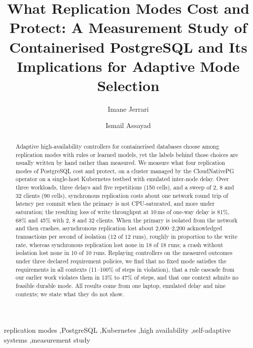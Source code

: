 \documentclass[preprint,12pt]{elsarticle}
\begin{document}
\begin{frontmatter}
\title{What Replication Modes Cost and Protect: A Measurement Study of Containerised PostgreSQL and Its Implications for Adaptive Mode Selection}

\author[lis]{Imane Jerrari}
\author[lis]{Ismail Assayad}
\address[lis]{Laboratory of Information Systems (LIS), Faculty of Sciences Ain Chock \& ENSEM, Hassan II University of Casablanca, Casablanca, Morocco}

\begin{abstract}
Adaptive high-availability controllers for containerised databases choose among replication modes with rules or learned models, yet the labels behind those choices are usually written by hand rather than measured. We measure what four replication modes of PostgreSQL cost and protect, on a cluster managed by the CloudNativePG operator on a single-host Kubernetes testbed with emulated inter-node delay. Over three workloads, three delays and five repetitions (150 cells), and a sweep of 2, 8 and 32 clients (90 cells), synchronous replication costs about one network round trip of latency per commit when the primary is not CPU-saturated, and more under saturation; the resulting loss of write throughput at 10\,ms of one-way delay is 81\%, 68\% and 45\% with 2, 8 and 32 clients. When the primary is isolated from the network and then crashes, asynchronous replication lost about 2,000--2,200 acknowledged transactions per second of isolation (12 of 12 runs), roughly in proportion to the write rate, whereas synchronous replication lost none in 18 of 18 runs; a crash without isolation lost none in 10 of 10 runs. Replaying controllers on the measured outcomes under three declared requirement policies, we find that no fixed mode satisfies the requirements in all contexts (11--100\% of steps in violation), that a rule cascade from our earlier work violates them in 13\% to 47\% of steps, and that one context admits no feasible durable mode. All results come from one laptop, emulated delay and nine contexts; we state what they do not show.
\end{abstract}

\begin{keyword}
replication modes \sep PostgreSQL \sep Kubernetes \sep high availability \sep self-adaptive systems \sep measurement study
\end{keyword}
\end{frontmatter}
\end{document}
